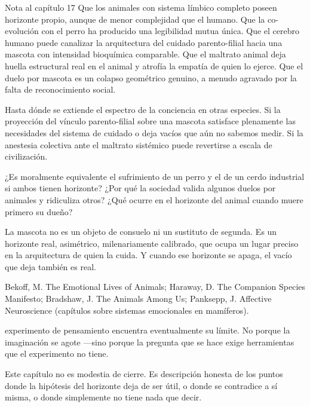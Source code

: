 \begin{notacap}{Nota al capítulo 17}
 Que los animales con sistema límbico completo poseen horizonte propio, aunque de menor complejidad que el humano. Que la co-evolución con el perro ha producido una legibilidad mutua única. Que el cerebro humano puede canalizar la arquitectura del cuidado parento-filial hacia una mascota con intensidad bioquímica comparable. Que el maltrato animal deja huella estructural real en el animal y atrofía la empatía de quien lo ejerce. Que el duelo por mascota es un colapso geométrico genuino, a menudo agravado por la falta de reconocimiento social.

 Hasta dónde se extiende el espectro de la conciencia en otras especies. Si la proyección del vínculo parento-filial sobre una mascota satisface plenamente las necesidades del sistema de cuidado o deja vacíos que aún no sabemos medir. Si la anestesia colectiva ante el maltrato sistémico puede revertirse a escala de civilización.

 ¿Es moralmente equivalente el sufrimiento de un perro y el de un cerdo industrial si ambos tienen horizonte? ¿Por qué la sociedad valida algunos duelos por animales y ridiculiza otros? ¿Qué ocurre en el horizonte del animal cuando muere primero su dueño?

 La mascota no es un objeto de consuelo ni un sustituto de segunda. Es un horizonte real, asimétrico, milenariamente calibrado, que ocupa un lugar preciso en la arquitectura de quien la cuida. Y cuando ese horizonte se apaga, el vacío que deja también es real.

 Bekoff, M. The Emotional Lives of Animals; Haraway, D. The Companion Species Manifesto; Bradshaw, J. The Animals Among Us; Panksepp, J. Affective Neuroscience (capítulos sobre sistemas emocionales en mamíferos).
\end{notacap}
\noindent {} experimento de pensamiento encuentra eventualmente su límite. No porque la imaginación se agote —sino porque la pregunta que se hace exige herramientas que el experimento no tiene.

Este capítulo no es modestia de cierre. Es descripción honesta de los puntos donde la hipótesis del horizonte deja de ser útil, o donde se contradice a sí misma, o donde simplemente no tiene nada que decir.

